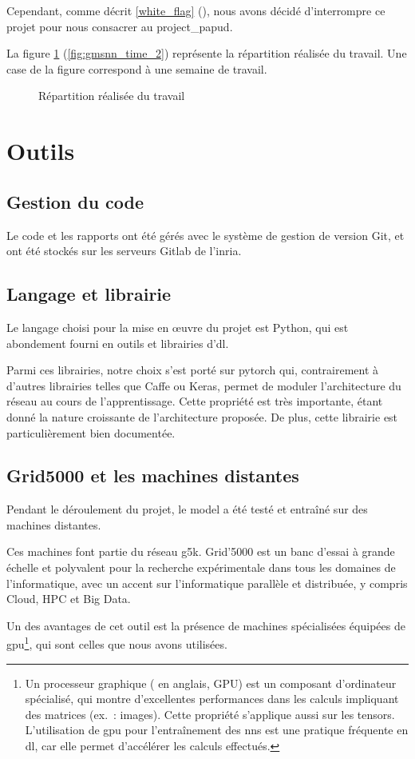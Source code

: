 Cependant, comme décrit \autoref{white_flag} (), nous avons décidé d'interrompre ce projet pour nous consacrer au \gls{project_papud}.

La figure \ref{fig:gmsnn_time_2} (\autoref{fig:gmsnn_time_2}) représente la répartition réalisée du travail. Une case de la figure correspond à une semaine de travail.

\begin{figure}[ht]
	\centering
	\caption{Répartition réalisée du travail}\label{fig:gmsnn_time_2}
\end{figure}

\pagebreak
\section{Outils}
\subsection{Gestion du code}
Le code et les rapports ont été gérés avec le système de gestion de version Git, et ont été stockés sur les serveurs Gitlab de l'\gls{inria}.

\subsection{Langage et librairie}
Le langage choisi pour la mise en œuvre du projet est Python, qui est abondement fourni en outils et librairies d'\gls{dl}.

Parmi ces librairies, notre choix s'est porté sur \gls{pytorch} qui, contrairement à d'autres librairies telles que Caffe ou Keras, permet de moduler l'architecture du réseau au cours de l'apprentissage. Cette propriété est très importante, étant donné la nature \og croissante\fg{} de l'architecture proposée. De plus, cette librairie est particulièrement bien documentée.

\subsection{Grid5000 et les machines distantes}
Pendant le déroulement du projet, le \gls{model} a été testé et entraîné sur des machines distantes.

Ces machines font partie du réseau \gls{g5k}.
\og Grid'5000 est un banc d'essai à grande échelle et polyvalent pour la recherche expérimentale dans tous les domaines de l'informatique, avec un accent sur l'informatique parallèle et distribuée, y compris Cloud, HPC et Big Data.\fg{}~\autocite{g5k}

Un des avantages de cet outil est la présence de machines spécialisées équipées de \gls{gpu}\footnote{Un processeur graphique ( en anglais, GPU) est un composant d'ordinateur spécialisé, qui montre d'excellentes performances dans les calculs impliquant des \glspl{matrice} (ex.~: images). Cette propriété s'applique aussi sur les \glspl{tensor}. L'utilisation de \gls{gpu} pour l'entraînement des \glspl{nn} est une pratique fréquente en \gls{dl}, car elle permet d'accélérer les calculs effectués.}, qui sont celles que nous avons utilisées.